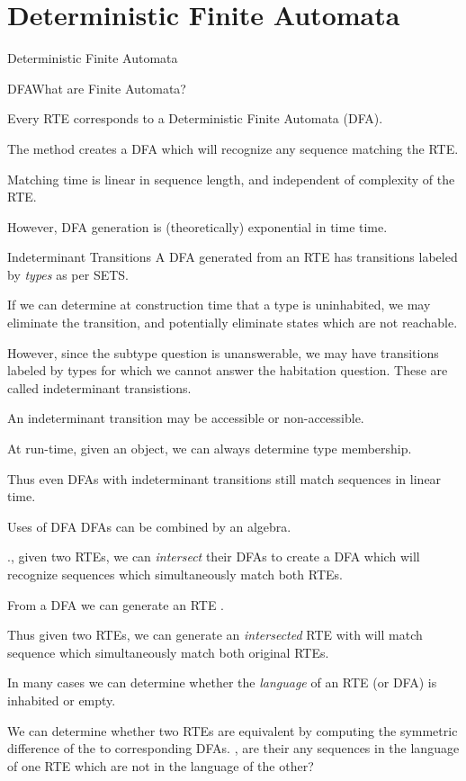 \section{Deterministic Finite Automata}

\begin{frame}{Deterministic Finite Automata}
\end{frame}


\begin{frame}{DFA}{What are Finite Automata?}

  Every RTE corresponds to a Deterministic Finite Automata (DFA).

  The method  creates a DFA which will recognize any sequence matching the RTE.

  Matching time is linear in sequence length, and independent of complexity of the RTE.

  However, DFA generation is (theoretically) exponential in time time.

\end{frame}

\begin{frame}{Indeterminant Transitions}
  A DFA generated from an RTE has transitions labeled by \emph{types} as per SETS.

  If we can determine at construction time that a type is uninhabited, we may eliminate the
  transition, and potentially eliminate states which are not reachable.

  However, since the subtype question is unanswerable, we may have transitions labeled by types
  for which we cannot answer the habitation question.  These are called indeterminant transistions.

  An indeterminant transition may be accessible or non-accessible.

  At run-time, given an object, we can always determine type membership.

  Thus even DFAs with indeterminant transitions still match sequences in linear time.  
\end{frame}


\begin{frame}{Uses of DFA}
  DFAs can be combined by an algebra.

  \Eg., given two RTEs, we can \emph{intersect} their DFAs to create a
  DFA which will recognize sequences which simultaneously match both
  RTEs.

  From a DFA we can generate an RTE  .

  Thus given two RTEs, we can generate an \emph{intersected} RTE with will match
  sequence which simultaneously match both original RTEs.

  In many cases we can determine whether the \emph{language} of an RTE (or DFA)
  is inhabited or empty.

  We can determine whether two RTEs are equivalent by computing the symmetric
  difference of the to corresponding DFAs.  \Ie, are their any sequences in the
  language of one RTE which are not in the language of the other?
\end{frame}
